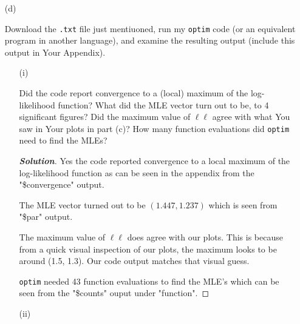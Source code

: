 \documentclass[12pt]{article}
\newenvironment{solution}{\begin{tcolorbox}[breakable]\begin{proof}[\textbf{\textit{Solution}}] }{\end{proof}\end{tcolorbox}}
\begin{document}
\begin{itemize}

\item[(d)]

\textit{} Download the \texttt{.txt} file just mentiuoned, run my \texttt{optim} code (or an equivalent program in another language), and examine the resulting output (include this output in Your Appendix). 

\begin{itemize}

\item[(i)]

Did the code report convergence to a (local) maximum of the log-likelihood function? \textit{\fbox{\textbf{[5 points]}}} What did the MLE vector turn out to be, to 4 significant figures? \textit{\fbox{\textbf{[5 points]}}} Did the maximum value of $\ell \ell$ agree with what You saw in Your plots in part (c)? \textit{\fbox{\textbf{[5 points]}}} How many function evaluations did \texttt{optim} need to find the MLEs? \textit{\fbox{\textbf{[5 points]}}}

\begin{solution}
    Yes the code reported convergence to a local maximum of the log-likelihood function as can be seen in the appendix from the "\$convergence" output. 

    The MLE vector turned out to be $(1.447, 1.237)$ which is seen from "\$par" output. 

    The maximum value of $\ell\ell$ does agree with our plots. This is because from a quick visual inspection of our plots, the maximum looks to be around (1.5, 1.3). Our code output matches that visual guess. 

    \texttt{optim} needed 43 function evaluations to find the MLE's which can be seen from the "\$counts" ouput under "function". 


\end{solution}

\item[(ii)]


\end{itemize}
\end{itemize}
\end{document}
